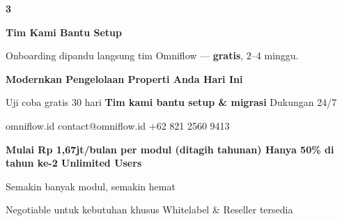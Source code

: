 \documentclass[a4paper]{article}
\begin{document}
\begin{center}
\begin{minipage}[t]{0.318\textwidth}
{\begin{minipage}[t][4.7cm][c]{\dimexpr\linewidth-2\fboxsep\relax}
            \begin{center}{\fontsize{22}{26}\selectfont\bfseries\color{BluePrimary} 3}\end{center}
            \vspace{2pt}
            \begin{center}
                {\fontsize{10}{13}\selectfont\bfseries\color{BlueDark} Tim Kami Bantu Setup}\par\vspace{3pt}
                {\fontsize{9}{12}\selectfont\color{TextDark} Onboarding dipandu langsung tim Omniflow --- \textbf{gratis}, 2--4 minggu.}
            \end{center}
        \end{minipage}}
\end{minipage}
\end{center}

\vspace{8pt}

{\setlength{\fboxsep}{10pt}\setlength{\fboxrule}{0pt}%
\noindent\colorbox{BluePrimary}{%
    \begin{minipage}{\dimexpr\textwidth-2\fboxsep\relax}
        \centering
        {\fontsize{13}{16}\selectfont\bfseries\color{White} Modernkan Pengelolaan Properti Anda Hari Ini}\par\vspace{3pt}
        {\fontsize{9.5}{12}\selectfont\color{BlueMid} Uji coba gratis 30 hari \enspace\textbullet\enspace \textbf{Tim kami bantu setup \& migrasi} \enspace\textbullet\enspace Dukungan 24/7}\par\vspace{2pt}
        {\fontsize{9.5}{12}\selectfont\color{BlueLight} omniflow.id \enspace\textbullet\enspace contact@omniflow.id \enspace\textbullet\enspace +62 821 2560 9413}
    \end{minipage}}}


\vspace{6pt}

{\setlength{\fboxsep}{8pt}\setlength{\fboxrule}{0pt}%
\noindent\colorbox{BlueBg}{%
    \begin{minipage}{\dimexpr\textwidth-2\fboxsep\relax}
        \centering
        {\fontsize{9}{12}\selectfont\bfseries\color{BluePrimary}
        Mulai Rp 1,67jt/bulan per modul (ditagih tahunan) \enspace\textbullet\enspace Hanya 50\% di tahun ke-2 \enspace\textbullet\enspace Unlimited Users}\par\vspace{1pt}
        {\fontsize{8.5}{11}\selectfont\color{BlueDark}
        Semakin banyak modul, semakin hemat}\par\vspace{1pt}
        {\fontsize{8}{10}\selectfont\color{TextLight}
        Negotiable untuk kebutuhan khusus \enspace\textbullet\enspace Whitelabel \& Reseller tersedia}
    \end{minipage}}}

\restoregeometry
\pagestyle{empty}
\end{document}
